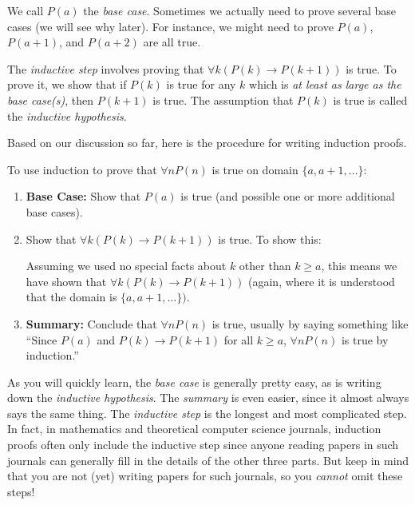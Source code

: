 We call $P(a)$ the {\em base case}.
Sometimes we actually need to prove several
base cases (we will see why later).  For instance,
we might need to prove $P(a)$, $P(a+1)$, and $P(a+2)$ 
are all true.

The {\em inductive step}
involves proving that  $\forall k(P(k)\rightarrow P(k+1))$
is true.  To prove it, we show that if $P(k)$ is true for any $k$ 
which is {\em at least as large as the base case(s)}, 
then $P(k+1)$ is true. 
The assumption that $P(k)$ is true is called the {\em inductive hypothesis}.

Based on our discussion so far, here is the procedure for writing induction proofs.

\newpage %

\begin{proc}\label{proc:induct1}
To use induction to prove that $\forall n P(n)$ is true on domain
$\{a,a+1,\ldots\}$:
\begin{enumerate}
\item
{\bf Base Case:} Show that $P(a)$ is true (and possible one or more additional base cases).
\item 
Show that $\forall k(P(k)\rightarrow P(k+1))$ is true.
To show this:
Assuming we used no special facts about $k$ other than 
$k\geq a$, this means we have shown that 
$\forall k(P(k)\rightarrow P(k+1))$ 
(again, where it is understood that the domain is $\{a,a+1,\ldots\})$.
\item
{\bf Summary:} Conclude that $\forall n P(n)$ is true, usually by saying
something like ``Since $P(a)$ and $P(k)\rightarrow P(k+1)$ for all $k\geq a$, 
$\forall n P(n)$ is true by induction.''
\end{enumerate}
\end{proc}

As you will quickly learn, the {\em base case} is generally pretty easy, 
as is writing down the {\em inductive hypothesis}. The {\em summary} is 
even easier, since it almost always says the same thing.
The {\em inductive step} is the longest and most complicated
step.  In fact, in mathematics and theoretical computer science journals, induction
proofs often only include the inductive step since anyone reading papers in such journals
can generally fill in the details of the other three parts.
But keep in mind that you are not (yet) writing papers for such journals, so you
{\em cannot} omit these steps!

